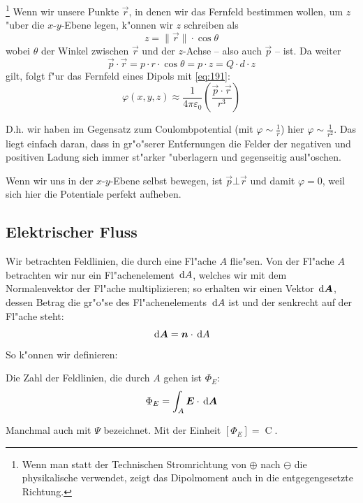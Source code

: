 \footnote{Wenn man statt der Technischen Stromrichtung von $\oplus$
  nach $\ominus$ die physikalische verwendet, zeigt das Dipolmoment
  auch in die entgegengesetzte Richtung.}
Wenn wir unsere Punkte $\vec r$, in denen wir das Fernfeld bestimmen
wollen, um $z$ "uber die $x$-$y$-Ebene legen, k"onnen wir $z$ schreiben als
$$
z = \|\vec r\| \cdot \cos \theta
$$
wobei $\theta$ der Winkel zwischen $\vec r$ und der 
$z$-Achse -- also auch $\vec p$ --
ist. Da weiter
$$
\vec p \cdot \vec r = p \cdot r \cdot \cos \theta =  p \cdot z = Q
\cdot d \cdot z
$$
gilt, folgt f"ur das Fernfeld eines Dipols mit \eqref{eq:191}:
\begin{equation}
   \label{eqn_fernfeld_dipol}
\boxed{   \varphi(x,y,z) \approx \frac{1}{4\pi\varepsilon_0} \left
   ( \frac{\vec p \cdot \vec r}{{r}^{3}} \right )  }
\end{equation}

D.h. wir haben im Gegensatz zum Coulombpotential (mit
$\varphi \sim
\frac{1}{r}$) hier $\varphi \sim \frac{1}{r^2}$. Das liegt einfach daran,
dass in gr"o"serer Entfernungen die Felder der negativen und positiven
Ladung sich immer st"arker "uberlagern und gegenseitig ausl"oschen.

Wenn wir uns in der $x$-$y$-Ebene selbst bewegen, ist $\vec p \bot
\vec r$ und damit $\varphi = 0$, weil sich hier die Potentiale perfekt aufheben.






\subsection{Elektrischer Fluss}
\label{kap_elektrischer-fluss}

Wir betrachten Feldlinien, die durch eine Fl"ache $A$ flie"sen. Von der
Fl"ache $A$ betrachten wir nur ein Fl"achenelement $\, \mathrm{d} A$, welches
wir mit dem Normalenvektor der Fl"ache multiplizieren; so erhalten wir
einen Vektor $\, \mathrm{d} \boldsymbol{A}$, dessen Betrag die gr"o"se des
Fl"achenelements $\, \mathrm{d} A$ ist und der senkrecht auf der Fl"ache steht:
$$
\, \mathrm{d} \boldsymbol{A} = \boldsymbol{n} \cdot \, \mathrm{d} A
$$
So k"onnen wir definieren:
\begin{Def} \label{eq:193}
Die Zahl der Feldlinien, die durch $A$ gehen ist $\Phi_E$:
\begin{equation}
   \label{eq:194}
    \Phi_E = \int_A \boldsymbol{E} \cdot \, \mathrm{d} \boldsymbol{A}
\end{equation}
\end{Def}
Manchmal auch mit $\Psi$ bezeichnet. Mit der Einheit $[\Phi_E] =
\operatorname{C}$.

